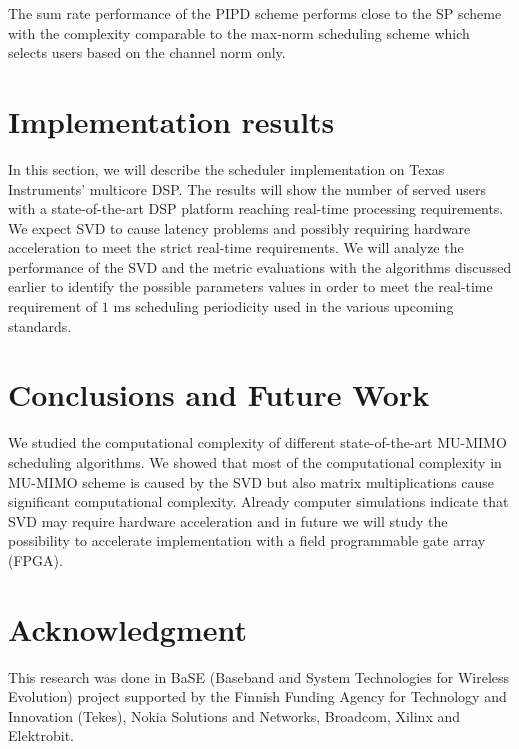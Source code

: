 \documentclass[conference]{./../../IEEE/IEEEtran}
\begin{document}
The sum rate performance of the PIPD scheme performs close to the SP scheme with the complexity
comparable to the max-norm scheduling scheme which selects users based on the channel norm only.


\section{Implementation results}
\label{sec:implementation}
In this section, we will describe the scheduler implementation on Texas Instruments' multicore DSP. The results will show the number of served users with a state-of-the-art DSP platform reaching real-time processing requirements. We expect SVD to cause latency problems and possibly requiring hardware acceleration to meet the strict real-time requirements. We will analyze the performance of the SVD and the metric evaluations with the algorithms discussed earlier to identify the possible parameters values in order to meet the real-time requirement of $1$ ms scheduling periodicity used in the various upcoming standards.


\section{Conclusions and Future Work}
\label{sec:conclusion}
We studied the computational complexity of different state-of-the-art MU-MIMO scheduling algorithms. We showed that most of the computational complexity in MU-MIMO scheme is caused by the SVD but also matrix multiplications cause significant computational complexity. Already computer simulations indicate that SVD may require hardware acceleration and in future we will study the possibility to accelerate implementation with a field programmable gate array (FPGA).

\section*{Acknowledgment}
This research was done in BaSE (Baseband and System Technologies for Wireless Evolution) project supported by the Finnish Funding Agency for Technology and Innovation (Tekes), Nokia Solutions and Networks, Broadcom, Xilinx and Elektrobit.



%
\end{document}
